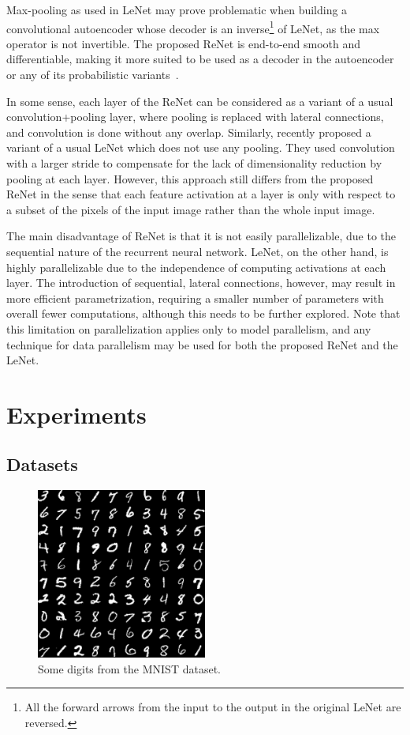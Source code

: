 Max-pooling as used in LeNet may prove problematic when building a
convolutional autoencoder whose decoder is an inverse\footnote{%
    All the forward arrows from the input to the output in the original LeNet
    are reversed.
}
of LeNet, as the max operator is not invertible. The proposed
ReNet is end-to-end smooth and differentiable, making it more suited to be used
as a decoder in the autoencoder or any of its probabilistic
variants~\citep[see e.g.,][]{Kingma+Welling-ICLR2014}.

In some sense, each layer of the ReNet can be considered as a variant of a
usual convolution+pooling layer, where pooling is replaced with lateral
connections, and convolution is done without any overlap. Similarly,
\citet{Springenberg2014} recently proposed a variant of a usual LeNet which
does not use any pooling.  They used convolution with a larger stride to
compensate for the lack of dimensionality reduction by pooling at each layer.
However, this approach still differs from the proposed ReNet in the sense that
each feature activation at a layer is only with respect to a subset of the
pixels of the input image rather than the whole input image.

The main disadvantage of ReNet is that it is not easily parallelizable, due to
the sequential nature of the recurrent neural network. LeNet, on the
other hand, is highly parallelizable due to the independence of computing
activations at each layer. The introduction of sequential, lateral connections,
however, may result in more efficient parametrization, requiring a smaller
number of parameters with overall fewer computations, although this needs to be
further explored. Note that this limitation on parallelization applies only to
model parallelism, and any technique for data parallelism may be used for both
the proposed ReNet and the LeNet.


\section{Experiments}\label{sec:renet_experiments}

\subsection{Datasets}

\begin{figure}[!t]
    \centering
    \includegraphics[width=0.5\textwidth]{img/renet/mnist_digits.png}
    \caption{Some digits from the MNIST dataset.}
    \label{fig:mnist_digits}
\end{figure}


